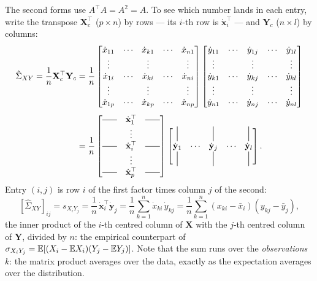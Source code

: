 \begin{notechapter}
The second forms use $A^\top A = A^2 = A$. To see which number lands in each
entry, write the transpose $\mathbf X_c^\top$ ($p\times n$) by rows --- its $i$-th
row is $\dot{\mathbf x}_i^\top$ --- and $\mathbf Y_c$ ($n\times l$) by columns:
\begin{align*}
  \hat\Sigma_{XY} = \frac1n\mathbf X_c^\top\mathbf Y_c
  &= \frac1n
  \begin{bmatrix}
    \dot x_{11} & \cdots & \dot x_{k1} & \cdots & \dot x_{n1}\\
    \vdots & & \vdots & & \vdots\\
    \dot x_{1i} & \cdots & \dot x_{ki} & \cdots & \dot x_{ni}\\
    \vdots & & \vdots & & \vdots\\
    \dot x_{1p} & \cdots & \dot x_{kp} & \cdots & \dot x_{np}
  \end{bmatrix}
  \begin{bmatrix}
    \dot y_{11} & \cdots & \dot y_{1j} & \cdots & \dot y_{1l}\\
    \vdots & & \vdots & & \vdots\\
    \dot y_{k1} & \cdots & \dot y_{kj} & \cdots & \dot y_{kl}\\
    \vdots & & \vdots & & \vdots\\
    \dot y_{n1} & \cdots & \dot y_{nj} & \cdots & \dot y_{nl}
  \end{bmatrix}\\[4pt]
  &= \frac1n
  \begin{bmatrix}
    \horzbar & \dot{\mathbf x}_1^\top & \horzbar\\
     & \vdots & \\
    \horzbar & \dot{\mathbf x}_i^\top & \horzbar\\
     & \vdots & \\
    \horzbar & \dot{\mathbf x}_p^\top & \horzbar
  \end{bmatrix}
  \begin{bmatrix}
    \vertbar & & \vertbar & & \vertbar\\
    \dot{\mathbf y}_1 & \cdots & \dot{\mathbf y}_j & \cdots & \dot{\mathbf y}_l\\
    \vertbar & & \vertbar & & \vertbar
  \end{bmatrix}.
\end{align*}
Entry $(i,j)$ is row $i$ of the first factor times column $j$ of the second:
\[
  [\hat\Sigma_{XY}]_{ij} = s_{X_iY_j} = \frac1n\,\dot{\mathbf x}_i^\top\dot{\mathbf y}_j
  = \frac1n\sum_{k=1}^n\dot x_{ki}\,\dot y_{kj}
  = \frac1n\sum_{k=1}^n(x_{ki} - \bar x_i)(y_{kj} - \bar y_j),
\]
the inner product of the $i$-th centred column of $\mathbf X$ with the $j$-th
centred column of $\mathbf Y$, divided by $n$: the empirical counterpart of
$\sigma_{X_iY_j} = \mathbb{E}[(X_i - \mathbb{E} X_i)(Y_j - \mathbb{E} Y_j)]$. Note that the sum runs over
the \emph{observations} $k$: the matrix product averages over the data, exactly as
the expectation averages over the distribution.


\end{notechapter}

